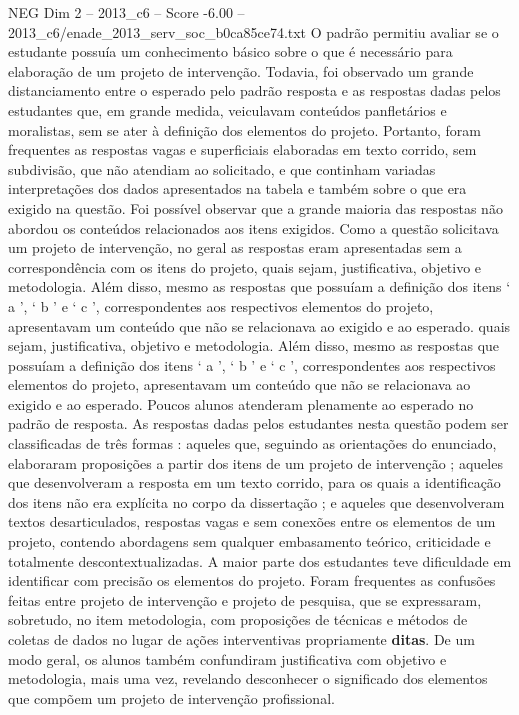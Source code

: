 \begin{textsample}{NEG Dim 2 – 2013\_c6 – Score -6.00 – 2013\_c6/enade\_2013\_serv\_soc\_b0ca85ce74.txt}
O padrão permitiu avaliar se o estudante possuía um conhecimento básico sobre o que é necessário para elaboração de um projeto de intervenção.
Todavia, foi observado um grande distanciamento entre o esperado pelo padrão resposta e as respostas dadas pelos estudantes que, em grande medida, veiculavam conteúdos panfletários e moralistas, sem se ater à definição dos elementos do projeto.
Portanto, foram frequentes as respostas vagas e superficiais elaboradas em texto corrido, sem subdivisão, que não atendiam ao solicitado, e que continham variadas interpretações dos dados apresentados na tabela e também sobre o que era exigido na questão.
Foi possível observar que a grande maioria das respostas não abordou os conteúdos relacionados aos itens exigidos.
Como a questão solicitava um projeto de intervenção, no geral as respostas eram apresentadas sem a correspondência com os itens do projeto, quais sejam, justificativa, objetivo e metodologia.
Além disso, mesmo as respostas que possuíam a definição dos itens ‘ a ’, ‘ b ’ e ‘ c ’, correspondentes aos respectivos elementos do projeto, apresentavam um conteúdo que não se relacionava ao exigido e ao esperado. quais sejam, justificativa, objetivo e metodologia.
Além disso, mesmo as respostas que possuíam a definição dos itens ‘ a ’, ‘ b ’ e ‘ c ’, correspondentes aos respectivos elementos do projeto, apresentavam um conteúdo que não se relacionava ao exigido e ao esperado.
Poucos alunos atenderam plenamente ao esperado no padrão de resposta.
As respostas dadas pelos estudantes nesta questão podem ser classificadas de três formas : aqueles que, seguindo as orientações do enunciado, elaboraram proposições a partir dos itens de um projeto de intervenção ; aqueles que desenvolveram a resposta em um texto corrido, para os quais a identificação dos itens não era explícita no corpo da dissertação ; e aqueles que desenvolveram textos desarticulados, respostas vagas e sem conexões entre os elementos de um projeto, contendo abordagens sem qualquer embasamento teórico, criticidade e totalmente descontextualizadas.
A maior parte dos estudantes teve dificuldade em identificar com precisão os elementos do projeto.
Foram frequentes as confusões feitas entre projeto de intervenção e projeto de pesquisa, que se expressaram, sobretudo, no item metodologia, com proposições de técnicas e métodos de coletas de dados no lugar de ações interventivas propriamente \textbf{ditas}.
De um modo geral, os alunos também confundiram justificativa com objetivo e metodologia, mais uma vez, revelando desconhecer o significado dos elementos que compõem um projeto de intervenção profissional.

\end{textsample}
